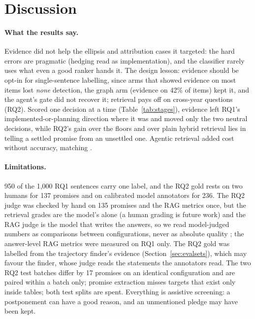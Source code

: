 \documentclass[11pt]{article}
\begin{document}
\section{Discussion}
\label{sec:discussion}

\paragraph{What the results say.}
Evidence did not help the ellipsis and attribution cases it targeted: the hard errors are pragmatic (hedging read as implementation), and the classifier rarely uses what even a good ranker hands it. The design lesson: evidence should be opt-in for single-sentence labelling, since arms that showed evidence on most items lost \emph{none} detection, the graph arm (evidence on 42\% of items) kept it, and the agent's gate did not recover it; retrieval pays off on cross-year questions (RQ2). Scored one decision at a time (Table~\ref{tab:stages}), evidence left RQ1's implemented-or-planning direction where it was and moved only the two neutral decisions, while RQ2's gain over the floors and over plain hybrid retrieval lies in telling a settled promise from an unsettled one. Agentic retrieval added cost without accuracy, matching \citet{ferrazzi2026agentic}.

\paragraph{Limitations.}
950 of the 1,000 RQ1 sentences carry one label, and the RQ2 gold rests on two humans for 137 promises and on calibrated model annotators for 236. The RQ2 judge was checked by hand on 135 promises and the RAG metrics once, but the retrieval grades are the model's alone (a human grading is future work) and the RAG judge is the model that writes the answers, so we read model-judged numbers as comparisons between configurations, never as absolute quality \citep{faggioli2023perspectives,soboroff2025dont}; the answer-level RAG metrics were measured on RQ1 only. The RQ2 gold was labelled from the trajectory finder's evidence (Section~\ref{sec:evalsets}), which may favour the finder, whose judge reads the statements the annotators read. The two RQ2 test batches differ by 17 promises on an identical configuration and are paired within a batch only; promise extraction misses targets that exist only inside tables; both test splits are spent. Everything is assistive screening: a postponement can have a good reason, and an unmentioned pledge may have been kept.
\end{document}

